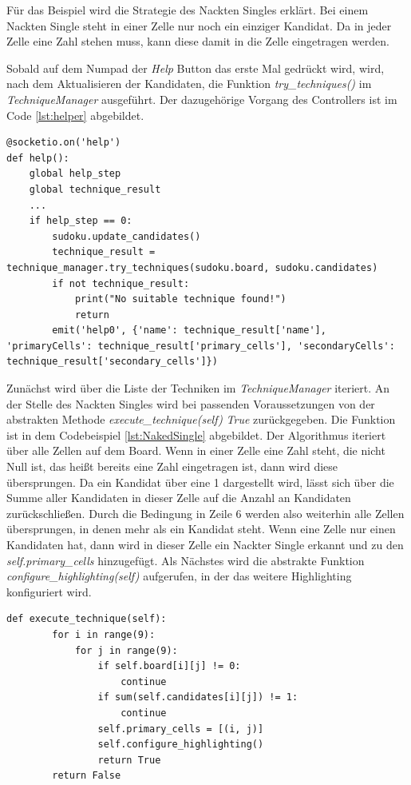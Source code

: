 Für das Beispiel wird die Strategie des Nackten Singles erklärt. Bei einem Nackten Single steht in einer Zelle nur noch ein einziger Kandidat. Da in jeder Zelle eine Zahl stehen muss, kann diese damit in die Zelle eingetragen werden.

Sobald auf dem Numpad der \textit{Help} Button das erste Mal gedrückt wird, wird, nach dem Aktualisieren der Kandidaten, die Funktion \textit{try\_techniques()} im \textit{TechniqueManager} ausgeführt. Der dazugehörige Vorgang des Controllers ist im Code \ref{lst:helper} abgebildet.

\begin{lstlisting}[caption={Serverseitig help}, label={lst:helper}]
@socketio.on('help')
def help():
	global help_step
	global technique_result
	...
	if help_step == 0:
		sudoku.update_candidates()
		technique_result = technique_manager.try_techniques(sudoku.board, sudoku.candidates)
		if not technique_result:
			print("No suitable technique found!")
			return
		emit('help0', {'name': technique_result['name'], 'primaryCells': technique_result['primary_cells'], 'secondaryCells': technique_result['secondary_cells']})
\end{lstlisting}

Zunächst wird über die Liste der Techniken im \textit{TechniqueManager} iteriert. An der Stelle des Nackten Singles wird bei passenden Voraussetzungen von der abstrakten Methode \textit{execute\_technique(self)} \textit{True} zurückgegeben. Die Funktion ist in dem Codebeispiel \ref{lst:NakedSingle} abgebildet. Der Algorithmus iteriert über alle Zellen auf dem Board. Wenn in einer Zelle eine Zahl steht, die nicht Null ist, das heißt bereits eine Zahl eingetragen ist, dann wird diese übersprungen. Da ein Kandidat über eine 1 dargestellt wird, lässt sich über die Summe aller Kandidaten in dieser Zelle auf die Anzahl an Kandidaten zurückschließen. Durch die Bedingung in Zeile 6 werden also weiterhin alle Zellen übersprungen, in denen mehr als ein Kandidat steht. Wenn eine Zelle nur einen Kandidaten hat, dann wird in dieser Zelle ein Nackter Single erkannt und zu den \textit{self.primary\_cells} hinzugefügt. Als Nächstes wird die abstrakte Funktion \textit{configure\_highlighting(self)} aufgerufen, in der das weitere Highlighting konfiguriert wird. 

\begin{lstlisting}[caption={Nackter Single}, label={lst:NakedSingle}]
	def execute_technique(self):
		for i in range(9):
			for j in range(9):
				if self.board[i][j] != 0:
					continue
				if sum(self.candidates[i][j]) != 1:
					continue
				self.primary_cells = [(i, j)]
				self.configure_highlighting()
				return True
		return False
\end{lstlisting}

